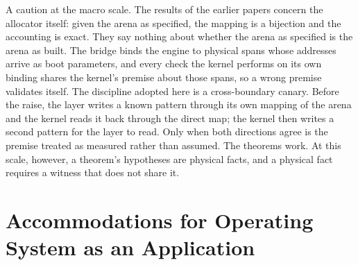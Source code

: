 \documentclass[11pt]{article}
\begin{document}
A caution at the macro scale. The results of the earlier papers concern the allocator itself: given the arena as specified, the mapping is a bijection and the accounting is exact. They say nothing about whether the arena as specified is the arena as built. The bridge binds the engine to physical spans whose addresses arrive as boot parameters, and every check the kernel performs on its own binding shares the kernel's premise about those spans, so a wrong premise validates itself. The discipline adopted here is a cross-boundary canary. Before the raise, the layer writes a known pattern through its own mapping of the arena and the kernel reads it back through the direct map; the kernel then writes a second pattern for the layer to read. Only when both directions agree is the premise treated as measured rather than assumed. The theorems work. At this scale, however, a theorem's hypotheses are physical facts, and a physical fact requires a witness that does not share it.

\section{Accommodations for Operating System as an Application}
\end{document}
